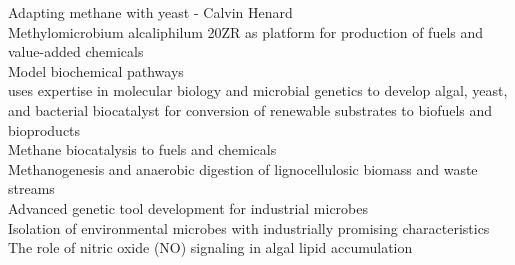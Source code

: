 \documentclass[11pt,a4paper,sans]{moderncv}
\begin{document}
Adapting methane with yeast - Calvin Henard\\

Methylomicrobium alcaliphilum 20ZR as platform for production of fuels and value-added chemicals\\

Model biochemical pathways\\

uses expertise in molecular biology and microbial genetics to develop algal, yeast, and bacterial biocatalyst for conversion of renewable substrates to biofuels and bioproducts\\

Methane biocatalysis to fuels and chemicals\\

    Methanogenesis and anaerobic digestion of lignocellulosic biomass and waste streams\\

    Advanced genetic tool development for industrial microbes\\

    Isolation of environmental microbes with industrially promising characteristics\\

    The role of nitric oxide (NO) signaling in algal lipid accumulation\\








\thispagestyle{titlepage}
\end{document}
